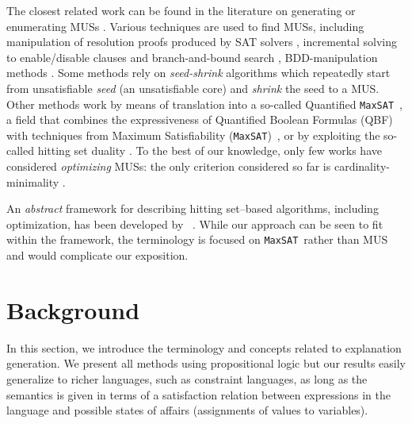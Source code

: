 \documentclass[twoside,11pt]{article}
\newcommand\citet[1]{\citeauthor{#1}~\citeyear{#1}}
\newcommand\comment[1]{\marginpar{\tiny #1}}
\renewcommand\comment[1]{#1}
\newcommand{\bart}[1]{{\comment{\color{OliveGreen}Bart: #1}}}
\newcommand\hitsetbased{hitting set--based\xspace} %
\newcommand\maxsat{\texttt{MaxSAT}}
\begin{document}
The closest related work can be found in the literature on generating or enumerating MUSs \cite{conf/sat/LynceM04,bacchus2016finding,bacchus2015using,liffiton2016fast}. 
Various techniques are used to find MUSs, including manipulation of resolution proofs produced by SAT solvers , incremental solving to enable/disable clauses and branch-and-bound search , BDD-manipulation methods \cite{huang}. 
Some methods rely on \emph{seed-shrink} algorithms \cite{bendik2020must,bendik2020replication} which repeatedly start from unsatisfiable \emph{seed} (an unsatisfiable core) and \emph{shrink} the seed to a MUS.
Other methods work by means of translation into a so-called Quantified \maxsat~\cite{DBLP:journals/constraints/IgnatievJM16}, a field that combines the expressiveness of Quantified Boolean Formulas (QBF) \cite{QBF} with techniques from Maximum Satisfiability (\maxsat)~\cite{DBLP:series/faia/LiM09}, or by exploiting the so-called hitting set duality \cite{ignatiev2015smallest}.
To the best of our knowledge, only few works have considered \emph{optimizing} MUSs: the only criterion considered so far is cardinality-minimality \cite{conf/sat/LynceM04,ignatiev2015smallest}.

%
%	
An \textit{abstract} framework for describing \hitsetbased algorithms, including optimization, has been developed by \citet{DBLP:conf/kr/SaikkoWJ16}. While our approach can be seen to fit within the framework, the terminology is focused on \maxsat~rather than MUS and would complicate our exposition.

\section{Background}\label{sec:background}

In this section, we introduce the terminology and concepts related to explanation generation.
We present all methods using propositional logic but our results easily generalize to richer languages, such as constraint languages, as long as the semantics is given in terms of a satisfaction relation between expressions in the language and possible states of affairs (assignments of values to variables). 
\end{document}
